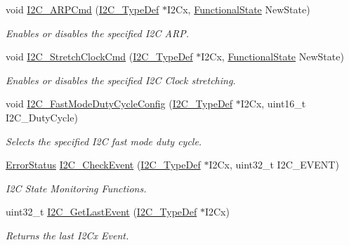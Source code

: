 \begin{DoxyCompactItemize}
void \hyperlink{group___i2_c___private___functions_ga66d86742bf1be58b17ef8779ffc79d02}{I2\+C\+\_\+\+A\+R\+P\+Cmd} (\hyperlink{struct_i2_c___type_def}{I2\+C\+\_\+\+Type\+Def} $\ast$I2\+Cx, \hyperlink{group___exported__types_gac9a7e9a35d2513ec15c3b537aaa4fba1}{Functional\+State} New\+State)
\begin{DoxyCompactList}\small\item\em Enables or disables the specified I2C A\+RP. \end{DoxyCompactList}\item 
void \hyperlink{group___i2_c___private___functions_ga7459feb3b1dfcd3e4f6574002ca7d3bd}{I2\+C\+\_\+\+Stretch\+Clock\+Cmd} (\hyperlink{struct_i2_c___type_def}{I2\+C\+\_\+\+Type\+Def} $\ast$I2\+Cx, \hyperlink{group___exported__types_gac9a7e9a35d2513ec15c3b537aaa4fba1}{Functional\+State} New\+State)
\begin{DoxyCompactList}\small\item\em Enables or disables the specified I2C Clock stretching. \end{DoxyCompactList}\item 
void \hyperlink{group___i2_c___private___functions_gaa570f76bc34e5b0531b29b1a90af1275}{I2\+C\+\_\+\+Fast\+Mode\+Duty\+Cycle\+Config} (\hyperlink{struct_i2_c___type_def}{I2\+C\+\_\+\+Type\+Def} $\ast$I2\+Cx, uint16\+\_\+t I2\+C\+\_\+\+Duty\+Cycle)
\begin{DoxyCompactList}\small\item\em Selects the specified I2C fast mode duty cycle. \end{DoxyCompactList}\item 
\hyperlink{group___exported__types_ga8333b96c67f83cba354b3407fcbb6ee8}{Error\+Status} \hyperlink{group___i2_c___private___functions_ga2d5701342f9d4c1f09bf9d3cdcacc326}{I2\+C\+\_\+\+Check\+Event} (\hyperlink{struct_i2_c___type_def}{I2\+C\+\_\+\+Type\+Def} $\ast$I2\+Cx, uint32\+\_\+t I2\+C\+\_\+\+E\+V\+E\+NT)
\begin{DoxyCompactList}\small\item\em I2C State Monitoring Functions. \end{DoxyCompactList}\item 
uint32\+\_\+t \hyperlink{group___i2_c___private___functions_ga29237aea9b5a3ead33167e1d027e9f1a}{I2\+C\+\_\+\+Get\+Last\+Event} (\hyperlink{struct_i2_c___type_def}{I2\+C\+\_\+\+Type\+Def} $\ast$I2\+Cx)
\begin{DoxyCompactList}\small\item\em Returns the last I2\+Cx Event. \end{DoxyCompactList}\item 

\end{DoxyCompactItemize}
